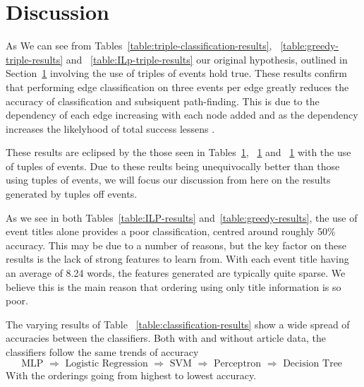 \documentclass[bsc,frontabs,twoside,singlespacing,parskip,deptreport]{infthesis}     %
\begin{document}
\section{Discussion}
As We can see from Tables~\ref{table:triple-classification-results}, ~\ref{table:greedy-triple-results} and
~\ref{table:ILp-triple-results} our original hypothesis, outlined in Section~\ref{}
involving the use of triples of events hold true.
These results confirm that performing edge classification on three events per edge greatly reduces the
accuracy of classification and subsiquent path-finding. This is due to the dependency of each edge
increasing with each node added and as the dependency increases the likelyhood of total success lessens \cite{}.

These results are eclipsed by the those seen in Tables~\ref{}, ~\ref{} and ~\ref{} with the use of tuples of events.
Due to these reults being unequivocally better than those using tuples of events, we will focus our discussion from here on
the results generated by tuples off events.

As we see in both Tables~\ref{table:ILP-results} and~\ref{table:greedy-results}, the use of event titles alone
provides a poor classification, centred around roughly 50\% accuracy. This may be due to a number of reasons,
but the key factor on these results is the lack of strong features to learn from. With each event title having an average of
8.24 words, the features generated are typically quite sparse. We believe this is the main reason that ordering using
only title information is so poor.

The varying results of Table ~\ref{table:classification-results} show a wide spread of accuracies between the classifiers.
Both with and without article data, the classifiers follow the same trends of accuracy
\begin{equation}
\text{MLP $\Rightarrow$ Logistic Regression $\Rightarrow$ SVM $\Rightarrow$ Perceptron $\Rightarrow$ Decision Tree }\nonumber  
\end{equation}
With the orderings going from highest to lowest accuracy.
\end{document}
